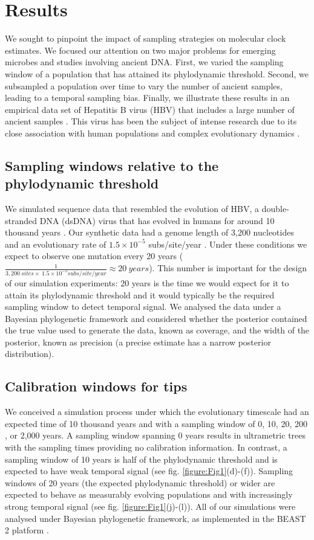\documentclass[11pt]{article}
\begin{document}
\section{Results}
We sought to pinpoint the impact of sampling strategies on molecular clock estimates. We focused our attention on two major problems for emerging microbes and studies involving ancient DNA. First, we varied the sampling window of a population that has attained its phylodynamic threshold. Second, we subsampled a population over time to vary the number of ancient samples, leading to a temporal sampling bias. Finally, we illustrate these results in an empirical data set of Hepatitis B virus (HBV) that includes a large number of ancient samples \citep{kocher2021ten}. This virus has been the subject of intense research due to its close association with human populations and complex evolutionary dynamics \citep{paraskevis2013dating, ross2018paradox, kahila2012tracing}.

\subsection{Sampling windows relative to the phylodynamic threshold}
We simulated sequence data that resembled the evolution of HBV, a double-stranded DNA (dsDNA) virus that has evolved in humans for around 10 thousand years \citep{kocher2021ten}. Our synthetic data had a genome length of 3,200 nucleotides and an evolutionary rate of $1.5\times10^{-5}$ subs/site/year \citep{kocher2021ten, muhlemann2018ancient}. Under these conditions we expect to observe one mutation every 20 years ($\frac{1}{3,200\ sites \times\ 1.5\times10^{-5}subs/site/year}\approx20\ years$). This number is important for the design of our simulation experiments: 20 years is the time we would expect for it to attain its phylodynamic threshold and it would typically be the required sampling window to detect temporal signal. We analysed the data under a Bayesian phylogenetic framework and considered whether the posterior contained the true value used to generate the data, known as coverage, and the width of the posterior, known as precision (a precise estimate has a narrow posterior distribution).

\subsection{Calibration windows for tips}
We conceived a simulation process under which the evolutionary timescale had an expected time of 10 thousand years and with a sampling window of 0, 10, 20, 200 , or 2,000 years. A sampling window spanning 0 years results in ultrametric trees with the sampling times providing no calibration information. In contrast, a sampling window of 10 years is half of the phylodynamic threshold and is expected to have weak temporal signal (see fig. \ref{figure:Fig1}(d)-(f)). Sampling windows of 20 years (the expected phylodynamic threshold) or wider are expected to behave as measurably evolving populations and with increasingly strong temporal signal (see fig. \ref{figure:Fig1}(j)-(l)). All of our simulations were analysed under Bayesian phylogenetic framework, as implemented in the BEAST 2 platform \citep{bouckaert2019beast}.
\end{document}
